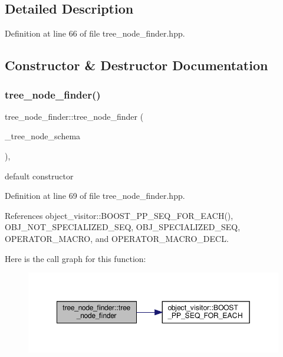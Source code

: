 \subsection{Detailed Description}


Definition at line 66 of file tree\+\_\+node\+\_\+finder.\+hpp.



\subsection{Constructor \& Destructor Documentation}
\mbox{\label{structtree__node__finder_ae98f28a15f13df7f86818718d3e84457}} 
\subsubsection{\texorpdfstring{tree\+\_\+node\+\_\+finder()}{tree\_node\_finder()}}
{\footnotesize\ttfamily tree\+\_\+node\+\_\+finder\+::tree\+\_\+node\+\_\+finder (\begin{DoxyParamCaption}\item[{const std\+::map$<$ \hyperlink{token__interface_8hpp_a14502d0757789149f644966ca931b126}{Tree\+Vocabulary\+Token\+Types\+\_\+\+Token\+Enum}, std\+::string $>$ \&}]{\+\_\+tree\+\_\+node\+\_\+schema }\end{DoxyParamCaption})\hspace{0.3cm}{\ttfamily [inline]}, {\ttfamily [explicit]}}



default constructor 



Definition at line 69 of file tree\+\_\+node\+\_\+finder.\+hpp.



References object\+\_\+visitor\+::\+B\+O\+O\+S\+T\+\_\+\+P\+P\+\_\+\+S\+E\+Q\+\_\+\+F\+O\+R\+\_\+\+E\+A\+C\+H(), O\+B\+J\+\_\+\+N\+O\+T\+\_\+\+S\+P\+E\+C\+I\+A\+L\+I\+Z\+E\+D\+\_\+\+S\+EQ, O\+B\+J\+\_\+\+S\+P\+E\+C\+I\+A\+L\+I\+Z\+E\+D\+\_\+\+S\+EQ, O\+P\+E\+R\+A\+T\+O\+R\+\_\+\+M\+A\+C\+RO, and O\+P\+E\+R\+A\+T\+O\+R\+\_\+\+M\+A\+C\+R\+O\+\_\+\+D\+E\+CL.

Here is the call graph for this function\+:
\nopagebreak
\begin{figure}[H]
\begin{center}
\leavevmode
\includegraphics[width=349pt]{da/dcb/structtree__node__finder_ae98f28a15f13df7f86818718d3e84457_cgraph}
\end{center}
\end{figure}


